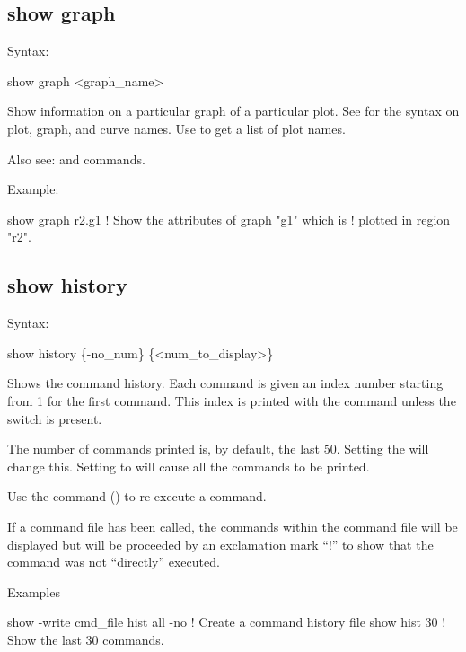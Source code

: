{{{{{%

\subsection{show graph}
\label{s:show.graph}

Syntax:
\begin{example}
  show graph <graph_name>
\end{example}

Show information on a particular graph of a particular plot. See  for the
syntax on plot, graph, and curve names.  Use  to get a list of plot names.

Also see:  and  commands.

Example:
\begin{example}
  show graph r2.g1         ! Show the attributes of graph "g1" which is 
                           !   plotted in region "r2".
\end{example}


\subsection{show history}
\label{s:show.history}

Syntax:
\begin{example}
  show history \{-no_num\} \{<num_to_display>\}
\end{example}

Shows the command history. Each command is given an index number starting from 1 for
the first command. This index is printed with the command unless the  switch
is present.

The number of commands printed is, by default, the last 50. Setting the  will
change this. Setting  to   will cause all the commands to be printed.

Use the command  () to re-execute a command. 


If a command file has been called, the commands within the command file will be displayed
but will be proceeded by an exclamation mark ``!'' to show that the command was not ``directly'' executed.

Examples
\begin{example}
  show -write cmd_file hist all -no   ! Create a command history file
  show hist 30                        ! Show the last 30 commands.
\end{example}

}}}}}
